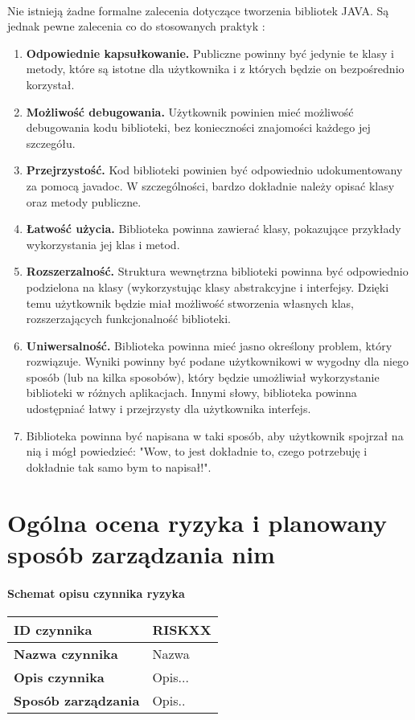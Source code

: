 \documentclass[a4paper,10pt]{article}
\begin{document}
\paragraph{} Nie istnieją żadne formalne zalecenia dotyczące tworzenia bibliotek JAVA. Są jednak pewne zalecenia co do stosowanych praktyk \cite{artOstandardach}:
\begin{enumerate}
\item \textbf{Odpowiednie kapsułkowanie.} Publiczne powinny być jedynie te klasy i metody, które są istotne dla użytkownika i z których będzie on bezpośrednio korzystał.
\item \textbf{Możliwość debugowania.} Użytkownik powinien mieć możliwość debugowania kodu biblioteki, bez konieczności znajomości każdego jej szczegółu.
\item  \textbf{Przejrzystość.} Kod biblioteki powinien być odpowiednio udokumentowany za pomocą javadoc. W szczególności, bardzo dokładnie należy opisać klasy oraz metody publiczne.
\item \textbf{Łatwość użycia.} Biblioteka powinna zawierać klasy, pokazujące przykłady wykorzystania jej klas i metod.
\item \textbf{ Rozszerzalność.} Struktura wewnętrzna biblioteki powinna być odpowiednio podzielona na klasy (wykorzystując klasy abstrakcyjne i interfejsy. Dzięki temu użytkownik będzie miał możliwość stworzenia własnych klas, rozszerzających funkcjonalność biblioteki.
\item \textbf{Uniwersalność.} Biblioteka powinna mieć jasno określony problem, który rozwiązuje. Wyniki powinny być podane użytkownikowi w wygodny dla niego sposób (lub na kilka sposobów), który będzie umożliwiał wykorzystanie biblioteki w różnych aplikacjach. Innymi słowy, biblioteka powinna udostępniać łatwy i przejrzysty dla użytkownika interfejs.
\item Biblioteka powinna być napisana w taki sposób, aby użytkownik spojrzał na nią i mógł powiedzieć: "Wow, to jest dokładnie to, czego potrzebuję i dokładnie tak samo bym to napisał!".

\end{enumerate}



\section{Ogólna ocena ryzyka i planowany sposób zarządzania nim}


\paragraph{Schemat opisu czynnika ryzyka}
\begin{center}
\begin{tabular}{|l|p{12cm}|}
\hline
\textbf{ID czynnika} &  RISKXX \tabularnewline \hline
\textbf{Nazwa czynnika} & Nazwa \tabularnewline \hline
\textbf{Opis czynnika} & Opis... \tabularnewline \hline
\textbf{Sposób zarządzania} & Opis.. \tabularnewline \hline
\end{tabular}
\end{center}
\end{document}
